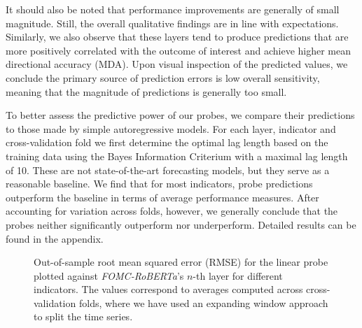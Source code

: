 \documentclass{article}
\theoremstyle{plain}
\theoremstyle{definition}
\theoremstyle{remark}
\begin{document}

It should also be noted that performance improvements are generally of small magnitude. Still, the overall qualitative findings are in line with expectations. Similarly, we also observe that these layers tend to produce predictions that are more positively correlated with the outcome of interest and achieve higher mean directional accuracy (MDA). Upon visual inspection of the predicted values, we conclude the primary source of prediction errors is low overall sensitivity, meaning that the magnitude of predictions is generally too small. 

To better assess the predictive power of our probes, we compare their predictions to those made by simple autoregressive models. For each layer, indicator and cross-validation fold we first determine the optimal lag length based on the training data using the Bayes Information Criterium with a maximal lag length of 10. These are not state-of-the-art forecasting models, but they serve as a reasonable baseline. We find that for most indicators, probe predictions outperform the baseline in terms of average performance measures. After accounting for variation across folds, however, we generally conclude that the probes neither significantly outperform nor underperform. Detailed results can be found in the appendix.


\begin{figure}


\caption{\label{fig-fomc}Out-of-sample root mean squared error (RMSE) for the linear probe plotted against \emph{FOMC-RoBERTa}'s \(n\)-th layer for different indicators. The values correspond to averages computed across cross-validation folds, where we have used an expanding window approach to split the time series.}

\end{figure}%
\end{document}

